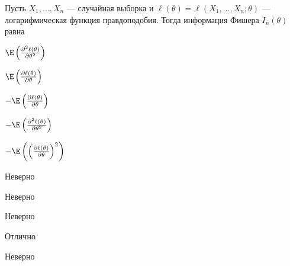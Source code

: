 
\begin{question}
Пусть \(X_1, \ldots , X_n\) --- случайная выборка и
\(\ell(\theta) = \ell(X_1, \ldots, X_n; \theta)\) --- логарифмическая
функция правдоподобия. Тогда информация Фишера \(I_n(\theta)\) равна
\begin{answerlist}
  \item \(\E \left( \frac{\partial^2 \ell (\theta)}{\partial \theta^2}\right)\)
  \item \(\E \left( \frac{\partial \ell (\theta)}{\partial \theta}\right)\)
  \item \(-\E \left( \frac{\partial \ell (\theta)}{\partial \theta}\right)\)
  \item \(-\E \left( \frac{\partial^2 \ell (\theta)}{\partial \theta^2}\right)\)
  \item \(-\E \left( \left( \frac{\partial \ell (\theta)}{\partial \theta} \right)^2 \right)\)
\end{answerlist}
\end{question}

\begin{solution}
\begin{answerlist}
  \item Неверно
  \item Неверно
  \item Неверно
  \item Отлично
  \item Неверно
\end{answerlist}
\end{solution}


